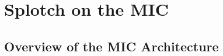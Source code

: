 \documentclass[runningheads,a4paper]{llncs}
\begin{document}




\section{Splotch on the MIC}
\label{sect:micsplotch}


\subsection{Overview of the MIC Architecture}
\label{sect:mic}
\end{document}
